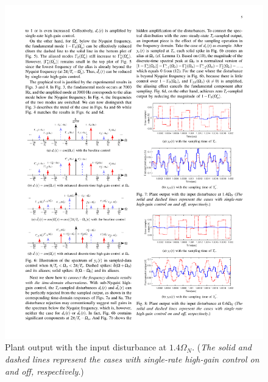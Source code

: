 \documentclass [11pt, proquest] {uwthesis}[2020/02/24]
\begin{document}
\begin{figure}[!ht]
\begin{centering}
{\begin{centering}
\includegraphics[width=12cm]{Spectral-analysis/FIG7b.pdf}
\par\end{centering}
}
\par\end{centering}
\caption{\label{fig:Plant-output-for-3}Plant output with the input disturbance
at $1.4\Omega_{N}$. (\emph{The solid and dashed lines represent the
cases with single-rate high-gain control on and off, respectively}.)}
\end{figure}
\end{document}
